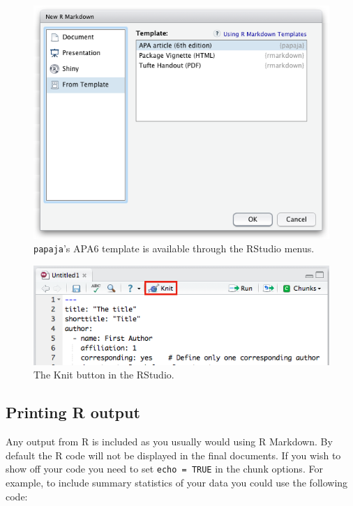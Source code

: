 \documentclass[english,man,floatsintext]{apa6}
\begin{document}
\begin{figure}

{\centering \includegraphics[width=5.19in]{../images/template_selection} 

}

\caption{\texttt{papaja}'s APA6 template is available through the RStudio menus.}\label{fig:menu}
\end{figure}



\begin{figure}

{\centering \includegraphics[width=4.81in]{../images/knitting} 

}

\caption{The Knit button in the RStudio.}\label{fig:knit}
\end{figure}

\hypertarget{printing-r-output}{%
\subsection{Printing R output}\label{printing-r-output}}

Any output from R is included as you usually would using R Markdown.
By default the R code will not be displayed in the final documents.
If you wish to show off your code you need to set \texttt{echo\ =\ TRUE} in the chunk options.
For example, to include summary statistics of your data you could use the following code:
\end{document}
